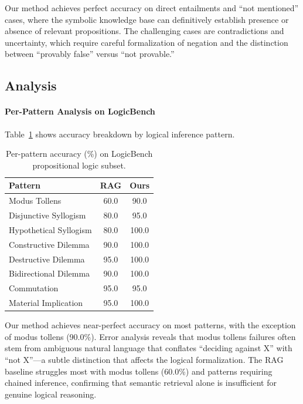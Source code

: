 Our method achieves perfect accuracy on direct entailments and ``not mentioned'' cases, where the symbolic knowledge base can definitively establish presence or absence of relevant propositions. The challenging cases are contradictions and uncertainty, which require careful formalization of negation and the distinction between ``provably false'' versus ``not provable.''

\subsection{Analysis}
\label{subsec:analysis}

\paragraph{Per-Pattern Analysis on LogicBench} Table~\ref{tab:logicbench_patterns} shows accuracy breakdown by logical inference pattern.

\begin{table}[t]
\centering
\caption{Per-pattern accuracy (\%) on LogicBench propositional logic subset.}
\label{tab:logicbench_patterns}
\begin{tabular}{lcc}
\toprule
\textbf{Pattern} & \textbf{RAG} & \textbf{Ours} \\
\midrule
Modus Tollens & 60.0 & 90.0 \\
Disjunctive Syllogism & 80.0 & 95.0 \\
Hypothetical Syllogism & 80.0 & 100.0 \\
Constructive Dilemma & 90.0 & 100.0 \\
Destructive Dilemma & 95.0 & 100.0 \\
Bidirectional Dilemma & 90.0 & 100.0 \\
Commutation & 95.0 & 95.0 \\
Material Implication & 95.0 & 100.0 \\
\bottomrule
\end{tabular}
\end{table}

Our method achieves near-perfect accuracy on most patterns, with the exception of modus tollens (90.0\%). Error analysis reveals that modus tollens failures often stem from ambiguous natural language that conflates ``deciding against X'' with ``not X''---a subtle distinction that affects the logical formalization. The RAG baseline struggles most with modus tollens (60.0\%) and patterns requiring chained inference, confirming that semantic retrieval alone is insufficient for genuine logical reasoning.

